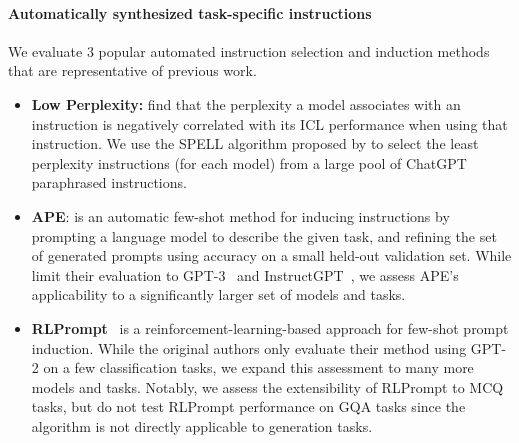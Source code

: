 \paragraph{Automatically synthesized task-specific instructions} We evaluate 3 popular automated instruction selection and induction methods that are representative of previous work.

\begin{itemize}[leftmargin=*]
    \item \textbf{Low Perplexity:} \cite{lowperplexityprompts} find that the perplexity a model associates with an instruction is negatively correlated with its ICL performance when using that instruction. We use the SPELL algorithm proposed by \citet{lowperplexityprompts} to select the least perplexity instructions (for each model) from a large pool of ChatGPT paraphrased instructions.

    \item \textbf{APE}: \cite{ape} is an automatic few-shot method for inducing instructions by prompting a language model to describe the given task, and refining the set of generated prompts using accuracy on a small held-out validation set. While \citet{ape} limit their evaluation to GPT-3~\cite{brown2020language} and InstructGPT~\cite{instructgpt}, we assess APE's applicability to a significantly larger set of models and tasks.

    \item \textbf{RLPrompt}~\cite{rlprompt} is a reinforcement-learning-based approach for few-shot prompt induction. While the original authors only evaluate their method using GPT-2 on a few classification tasks, we expand this assessment to many more models and tasks. Notably, we assess the extensibility of RLPrompt to MCQ tasks, but do not test RLPrompt performance on GQA tasks since the algorithm is not directly applicable to generation tasks. 
\end{itemize}


